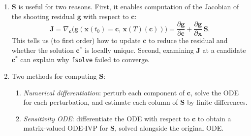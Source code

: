 \begin{solution}
    \begin{enumerate}[label=(\alph*)]
        \item $\mathbf{S}$ is useful for two reasons. First, it enables computation of the Jacobian of the shooting residual $\mathbf{g}$ with respect to $\mathbf{c}$:
        \[
            \mathbf{J} = \nabla_{\mathbf{c}}\bigl(\mathbf{g}(\mathbf{x}(t_0)=\mathbf{c},\,\mathbf{x}(T)(\mathbf{c}))\bigr) = \frac{\partial\mathbf{g}}{\partial\mathbf{c}} + \frac{\partial\mathbf{g}}{\partial\mathbf{x}}\,\mathbf{S}.
        \]
        This tells us (to first order) how to update $\mathbf{c}$ to reduce the residual and whether the solution $\mathbf{c}^*$ is locally unique. Second, examining $\mathbf{J}$ at a candidate $\mathbf{c}^*$ can explain why \texttt{fsolve} failed to converge.
        \item Two methods for computing $\mathbf{S}$:
        \begin{enumerate}[label=\roman*.]
            \item \textit{Numerical differentiation}: perturb each component of $\mathbf{c}$, solve the ODE for each perturbation, and estimate each column of $\mathbf{S}$ by finite differences.
            \item \textit{Sensitivity ODE}: differentiate the ODE with respect to $\mathbf{c}$ to obtain a matrix-valued ODE-IVP for $\mathbf{S}$, solved alongside the original ODE.
        \end{enumerate}
    \end{enumerate}
\end{solution}